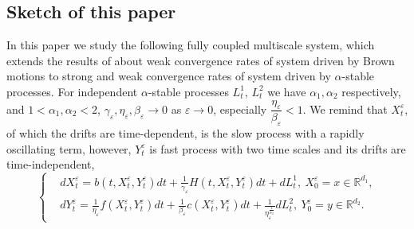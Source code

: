 \documentclass[11pt,reqno]{amsart}
\numberwithin{equation}{section}
\newcommand{\al}{\alpha}
\begin{document}
\subsection{Sketch of this paper}
In this paper we study the following fully coupled multiscale system, which extends the results of \cite{EY1,EY2,EY3,RX} about weak convergence rates of system driven by Brown motions to strong and weak convergence rates of system driven by $\al$-stable processes. For independent $\alpha$-stable processes  $L^{1}_{t}$, $L^{2}_{t}$ we have $\alpha_{1},\alpha_{2}$ respectively, and $1<\alpha_{1},\alpha_{2}<2$,  $\gamma_{\varepsilon},\eta_{\varepsilon},\beta_{\varepsilon}\rightarrow 0$ as $\varepsilon \rightarrow 0$, especially  $\dfrac{\eta_{\varepsilon}}{\beta_{\varepsilon}}<1$. We remind that $X_{t}^{\varepsilon}$, of which the drifts are time-dependent, is the slow process with a rapidly oscillating term, however, $Y_{t}^{\varepsilon}$ is fast process with two time scales and its drifts are time-independent, 
\begin{equation}\label{1.1}
	\left\{
	\begin{aligned}
		& dX_{t}^{\varepsilon}=b(t,X_{t}^{\varepsilon},Y_{t}^{\varepsilon})dt+\frac{1}{\gamma_{\varepsilon}}H(t,X_{t}^{\varepsilon},Y_{t}^{\varepsilon})dt+dL^{1}_{t},\ X^{\varepsilon}_{0}=x\in \mathbb{R}^{d_{1} },\\
		&dY_{t}^{\varepsilon}=\frac{1}{\eta_{\varepsilon}}f(X_{t}^{\varepsilon},Y_{t}^{\varepsilon})dt+\frac{1}{\beta_{\varepsilon}}c(X_{t}^{\varepsilon},Y_{t}^{\varepsilon})dt+\frac{1}{\eta_{\varepsilon}^{\frac{1}{\alpha_{2}}}}dL^{2}_{t},\ Y^{\varepsilon}_{0}=y\in \mathbb{R}^{d_{2}}.
	\end{aligned}
	\right.
\end{equation}
\end{document}
